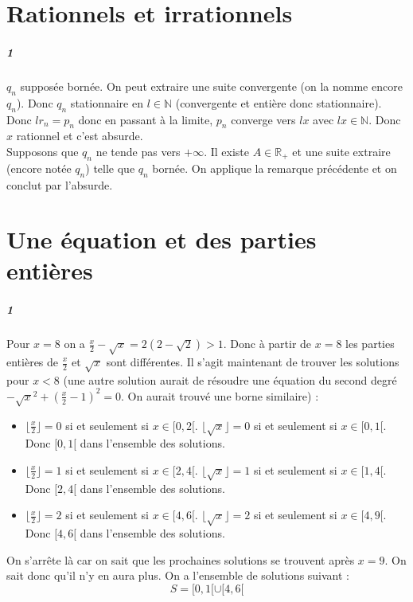 \documentclass[10pt,a4paper]{article}
\begin{document}
\section{Rationnels et irrationnels}
\subparagraph{1}$q_n$ supposée bornée. On peut extraire une suite convergente (on la nomme encore $q_n$). Donc $q_n$ stationnaire en $l \in \mathbb{N}$ (convergente et entière donc stationnaire). Donc $l r_n=p_n$ donc en passant à la limite, $p_n$ converge vers $lx$ avec $lx \in \mathbb{N}$. Donc $x$ rationnel et c'est absurde.\\
Supposons que $q_n$ ne tende pas vers $+\infty$. Il existe $A\in\mathbb{R}_+$ et une suite extraire (encore notée $q_n$) telle que $q_n$ bornée. On applique la remarque précédente et on conclut par l'absurde.

\section{Une équation et des parties entières}
\subparagraph{1}Pour $x=8$ on a $\frac{x}{2}-\sqrt{x}=2(2-\sqrt{2})>1$. Donc à partir de $x=8$ les parties entières de $\frac{x}{2}$ et $\sqrt{x}$ sont différentes. Il s'agit maintenant de trouver les solutions pour $x<8$ (une autre solution aurait de résoudre une équation du second degré $-\sqrt{x}^2+(\frac{x}{2}-1)^2=0$. On aurait trouvé une borne similaire) :
\begin{itemize}
\item $\lfloor \frac{x}{2} \rfloor =0$ si et seulement si $x \in [0,2[$. $\lfloor \sqrt{x} \rfloor=0$ si et seulement si $x \in [0,1[$. Donc $[0,1[$ dans l'ensemble des solutions.
\item $\lfloor \frac{x}{2} \rfloor =1$ si et seulement si $x \in [2,4[$. $\lfloor \sqrt{x} \rfloor=1$ si et seulement si $x \in [1,4[$. Donc $[2,4[$  dans l'ensemble des solutions.
\item $\lfloor \frac{x}{2} \rfloor =2$ si et seulement si $x \in [4,6[$. $\lfloor \sqrt{x} \rfloor=2$ si et seulement si $x \in [4,9[$. Donc $[4,6[$  dans l'ensemble des solutions.
\end{itemize}
On s'arrête là car on sait que les prochaines solutions se trouvent après $x=9$. On sait donc qu'il n'y en aura plus. On a l'ensemble de solutions suivant :
\begin{equation}
S=[0,1[ \cup [4,6[
\end{equation}
\end{document}
